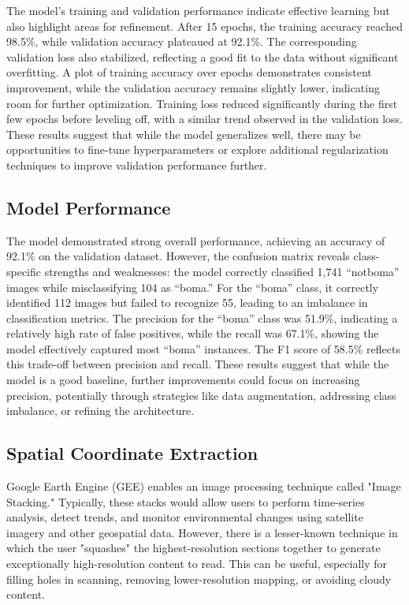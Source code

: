 \documentclass[10pt]{article}
\begin{document}
The model’s training and validation performance indicate effective learning but also highlight areas for refinement. After 15 epochs, the training accuracy reached 98.5\%, while validation accuracy plateaued at 92.1\%. The corresponding validation loss also stabilized, reflecting a good fit to the data without significant overfitting. A plot of training accuracy over epochs demonstrates consistent improvement, while the validation accuracy remains slightly lower, indicating room for further optimization. Training loss reduced significantly during the first few epochs before leveling off, with a similar trend observed in the validation loss. These results suggest that while the model generalizes well, there may be opportunities to fine-tune hyperparameters or explore additional regularization techniques to improve validation performance further.

\subsection{Model Performance}

The model demonstrated strong overall performance, achieving an accuracy of 92.1\% on the validation dataset. However, the confusion matrix reveals class-specific strengths and weaknesses: the model correctly classified 1,741 “notboma” images while misclassifying 104 as “boma.” For the “boma” class, it correctly identified 112 images but failed to recognize 55, leading to an imbalance in classification metrics. The precision for the “boma” class was 51.9\%, indicating a relatively high rate of false positives, while the recall was 67.1\%, showing the model effectively captured most “boma” instances. The F1 score of 58.5\% reflects this trade-off between precision and recall. These results suggest that while the model is a good baseline, further improvements could focus on increasing precision, potentially through strategies like data augmentation, addressing class imbalance, or refining the architecture.



\subsection{Spatial Coordinate Extraction}
\label{procedure}

Google Earth Engine (GEE) enables an image processing technique called "Image Stacking." Typically, these stacks would allow users to perform time-series analysis, detect trends, and monitor environmental changes using satellite imagery and other geospatial data. However, there is a lesser-known technique in which the user "squashes" the highest-resolution sections together to generate exceptionally high-resolution content to read. This can be useful, especially for filling holes in scanning, removing lower-resolution mapping, or avoiding cloudy content. 
\end{document}
